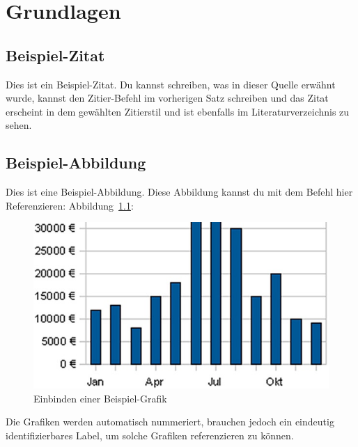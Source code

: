 \chapter{Grundlagen}\label{ch:grundlagen2}

\section{Beispiel-Zitat}\label{sec:beispiel-zitat}

Dies ist ein Beispiel-Zitat\cite{owasp-top10}.
Du kannst schreiben, was in dieser Quelle erwähnt wurde,
kannst den Zitier-Befehl im vorherigen Satz schreiben und das Zitat erscheint in dem gewählten Zitierstil und
ist ebenfalls im Literaturverzeichnis zu sehen.

\section{Beispiel-Abbildung}\label{sec:beispiel-abbildung}

Dies ist eine Beispiel-Abbildung.
Diese Abbildung kannst du mit dem Befehl hier Referenzieren: Abbildung~\ref{fig:anylabel}:

\begin{figure}[h!]
	\centering
	\includegraphics[width=\textwidth]{src/assets/some_graph}
	\caption{Einbinden einer Beispiel-Grafik}
	\label{fig:anylabel}
\end{figure}

Die Grafiken werden automatisch nummeriert, brauchen jedoch ein eindeutig identifizierbares Label, um
solche Grafiken referenzieren zu können.